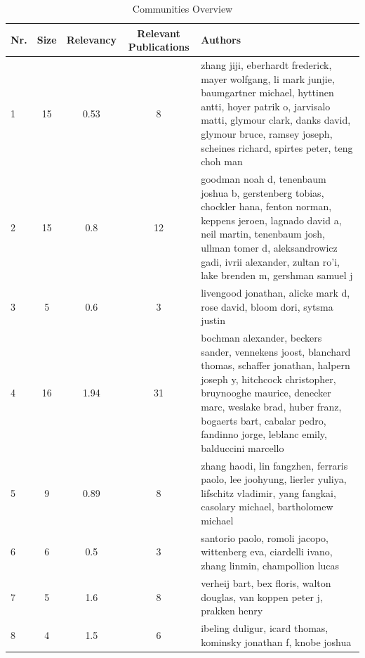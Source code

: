 \documentclass[11pt,a4paper]{book}
\theoremstyle{definition}
\theoremstyle{definition}
\theoremstyle{definition}
\theoremstyle{remark}
\begin{document}
\begin{table}
\centering
\scriptsize
\begin{tabular}{lcccp{6cm}}
\toprule
Nr. & Size & Relevancy & Relevant Publications  & Authors \\
\midrule
1  & 15 & 0.53 & 8 &  zhang jiji, eberhardt frederick, mayer wolfgang, li mark junjie, baumgartner michael, hyttinen antti, hoyer patrik o, jarvisalo matti, glymour clark, danks david, glymour bruce, ramsey joseph, scheines richard, spirtes peter, teng choh man \\
\midrule
2  &  15 & 0.8 & 12 &  goodman noah d, tenenbaum joshua b, gerstenberg tobias, chockler hana, fenton norman, keppens jeroen, lagnado david a, neil martin, tenenbaum josh, ullman tomer d, aleksandrowicz gadi, ivrii alexander, zultan ro'i, lake brenden m, gershman samuel j \\
\midrule
3 &   5 & 0.6 & 3 &  livengood jonathan, alicke mark d, rose david, bloom dori, sytsma justin \\

\midrule
4 & 16 & 1.94 & 31 &  bochman alexander, beckers sander, vennekens joost, blanchard thomas, schaffer jonathan, halpern joseph y, hitchcock christopher, bruynooghe maurice, denecker marc, weslake brad, huber franz, bogaerts bart, cabalar pedro, fandinno jorge, leblanc emily, balduccini marcello \\
\midrule
5 & 9 & 0.89 & 8 &  zhang haodi, lin fangzhen, ferraris paolo, lee joohyung, lierler yuliya, lifschitz vladimir, yang fangkai, casolary michael, bartholomew michael \\

\midrule
6 & 6 & 0.5 & 3 &  santorio paolo, romoli jacopo, wittenberg eva, ciardelli ivano, zhang linmin, champollion lucas \\
\midrule
7 &   5 & 1.6 & 8 &  verheij bart, bex floris, walton douglas, van koppen peter j, prakken henry \\


\midrule
8 &  4 & 1.5 & 6 &  ibeling duligur, icard thomas, kominsky jonathan f, knobe joshua \\

\bottomrule
\end{tabular}
\caption{Communities Overview}
\label{tab:community_overview}
\end{table}
\end{document}
